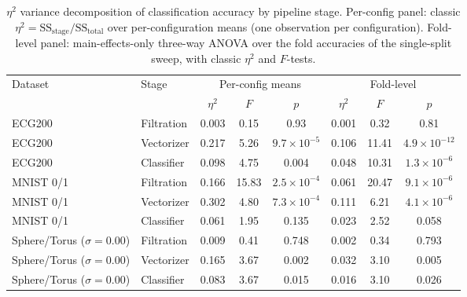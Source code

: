 \documentclass[12pt, a4paper]{report}
\theoremstyle{definition}
\theoremstyle{plain}
\theoremstyle{remark}
\begin{document}
\begin{table}[H]
  \centering
  \caption{$\eta^2$ variance decomposition of classification accuracy
  by pipeline stage. Per-config panel: classic
  $\eta^2 = \mathrm{SS}_{\text{stage}}/\mathrm{SS}_{\text{total}}$ over
  per-configuration means (one observation per configuration).
  Fold-level panel: main-effects-only three-way ANOVA over the fold
  accuracies of the single-split sweep, with classic $\eta^2$ and
  $F$-tests.}
  \label{tab:eta2}
  \footnotesize
  \begin{tabular}{llcccccc}
    \toprule
    Dataset & Stage & \multicolumn{3}{c}{Per-config means} &
    \multicolumn{3}{c}{Fold-level} \\
    \cmidrule(lr){3-5}\cmidrule(lr){6-8}
    & & $\eta^2$ & $F$ & $p$ & $\eta^2$ & $F$ & $p$ \\
    \midrule
    ECG200 & Filtration & 0.003 & 0.15 & 0.93 & 0.001 & 0.32 & 0.81 \\
    ECG200 & Vectorizer & 0.217 & 5.26 & $9.7\times10^{-5}$ & 0.106 & 11.41 & $4.9\times10^{-12}$ \\
    ECG200 & Classifier & 0.098 & 4.75 & 0.004 & 0.048 & 10.31 & $1.3\times10^{-6}$ \\
    \addlinespace
    MNIST 0/1 & Filtration & 0.166 & 15.83 & $2.5\times10^{-4}$ & 0.061 & 20.47 & $9.1\times10^{-6}$ \\
    MNIST 0/1 & Vectorizer & 0.302 & 4.80 & $7.3\times10^{-4}$ & 0.111 & 6.21 & $4.1\times10^{-6}$ \\
    MNIST 0/1 & Classifier & 0.061 & 1.95 & 0.135 & 0.023 & 2.52 & 0.058 \\
    \addlinespace
    Sphere/Torus ($\sigma{=}0.00$) & Filtration & 0.009 & 0.41 & 0.748 & 0.002 & 0.34 & 0.793 \\
    Sphere/Torus ($\sigma{=}0.00$) & Vectorizer & 0.165 & 3.67 & 0.002 & 0.032 & 3.10 & 0.005 \\
    Sphere/Torus ($\sigma{=}0.00$) & Classifier & 0.083 & 3.67 & 0.015 & 0.016 & 3.10 & 0.026 \\
    \bottomrule
  \end{tabular}


\end{table}
\end{document}
